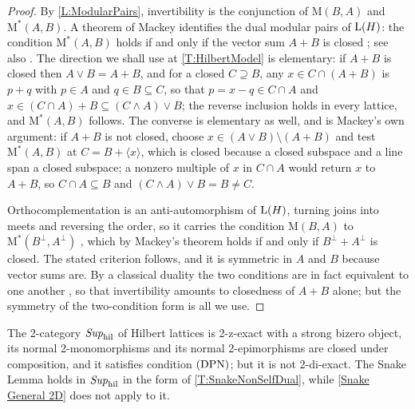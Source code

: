 \begin{proof}
  \leanok
  By \lemx\ref{L:ModularPairs}, invertibility is the conjunction of \(\mathrm{M}(B,A)\) and \(\mathrm{M}^{*}(A,B)\). A theorem of Mackey identifies the dual modular pairs of \(\mathrm{L}(H)\): the condition \(\mathrm{M}^{*}(A,B)\) holds if and only if the vector sum \(A+B\) is closed \cite[Theorem~III-6]{Mackey45}; see also \cite{Schreiner66}. The direction we shall use at \thex\ref{T:HilbertModel} is elementary: if \(A+B\) is closed then \(A\vee B=A+B\), and for a closed \(C\supseteq B\), any \(x\in C\cap(A+B)\) is \(p+q\) with \(p\in A\) and \(q\in B\subseteq C\), so that \(p=x-q\in C\cap A\) and \(x\in(C\cap A)+B\subseteq(C\wedge A)\vee B\); the reverse inclusion holds in every lattice, and \(\mathrm{M}^{*}(A,B)\) follows. The converse is elementary as well, and is Mackey's own argument: if \(A+B\) is not closed, choose \(x\in(A\vee B)\setminus(A+B)\) and test \(\mathrm{M}^{*}(A,B)\) at \(C=B+\langle x\rangle\), which is closed because a closed subspace and a line span a closed subspace; a nonzero multiple of \(x\) in \(C\cap A\) would return \(x\) to \(A+B\), so \(C\cap A\subseteq B\) and \((C\wedge A)\vee B=B\neq C\).

	Orthocomplementation is an anti-automorphism of \(\mathrm{L}(H)\), turning joins into meets and reversing the order, so it carries the condition \(\mathrm{M}(B,A)\) to \(\mathrm{M}^{*}(B^{\perp},A^{\perp})\) \cite[Theorem~5(i)]{Schreiner66}, which by Mackey's theorem holds if and only if \(B^{\perp}+A^{\perp}\) is closed. The stated criterion follows, and it is symmetric in \(A\) and \(B\) because vector sums are. By a classical duality the two conditions are in fact equivalent to one another \cite[Theorem~IV.4.8]{Kato}, so that invertibility amounts to closedness of \(A+B\) alone; but the symmetry of the two-condition form is all we use.
\end{proof}

\begin{theorem}
  \label{T:HilbertModel} 
  The 2-category \(\mathit{Sup}_{\mathrm{hil}}\) of Hilbert lattices is 2-z-exact with a strong bizero object, its normal 2-monomorphisms and its normal 2-epimorphisms are closed under composition, and it satisfies condition \(\textup{(DPN)}\); but it is not 2-di-exact. The Snake Lemma holds in \(\mathit{Sup}_{\mathrm{hil}}\) in the form of \thex\ref{T:SnakeNonSelfDual}, while \thex\ref{Snake General 2D} does not apply to it.
\end{theorem}

